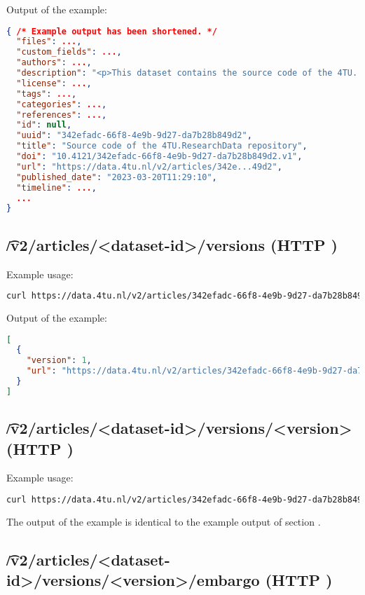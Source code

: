   Output of the example:
\begin{lstlisting}[language=JSON]
{ /* Example output has been shortened. */
  "files": ...,
  "custom_fields": ...,
  "authors": ...,
  "description": "<p>This dataset contains the source code of the 4TU...",
  "license": ...,
  "tags": ...,
  "categories": ...,
  "references": ...,
  "id": null,
  "uuid": "342efadc-66f8-4e9b-9d27-da7b28b849d2",
  "title": "Source code of the 4TU.ResearchData repository",
  "doi": "10.4121/342efadc-66f8-4e9b-9d27-da7b28b849d2.v1",
  "url": "https://data.4tu.nl/v2/articles/342e...49d2",
  "published_date": "2023-03-20T11:29:10",
  "timeline": ...,
  ...
}
\end{lstlisting}

\subsection{\t{/v2/articles/<dataset-id>/versions} (HTTP )}

  Example usage:
\begin{lstlisting}[language=bash]
curl https://data.4tu.nl/v2/articles/342efadc-66f8-4e9b-9d27-da7b28b849d2/versions | jq
\end{lstlisting}

  Output of the example:
\begin{lstlisting}[language=JSON]
[
  {
    "version": 1,
    "url": "https://data.4tu.nl/v2/articles/342efadc-66f8-4e9b-9d27-da7b28b849d2/versions/1"
  }
]
\end{lstlisting}

\subsection{\t{/v2/articles/<dataset-id>/versions/<version>} (HTTP )}

  Example usage:
\begin{lstlisting}[language=bash]
curl https://data.4tu.nl/v2/articles/342efadc-66f8-4e9b-9d27-da7b28b849d2/versions/1 | jq
\end{lstlisting}

  The output of the example is identical to the example output of section
  .

\subsection{\t{/v2/articles/<dataset-id>/versions/<version>/embargo} (HTTP )}

